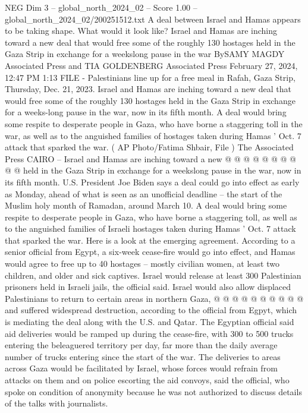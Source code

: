 \begin{textsample}{NEG Dim 3 – global\_north\_2024\_02 – Score 1.00 – global\_north\_2024\_02/200251512.txt}  \label{ex:f3_neg_205}
A deal between Israel and Hamas appears to be taking shape.
What would it look like?
Israel and Hamas are inching toward a new deal that would free some of the roughly 130 hostages held in the Gaza Strip in exchange for a weekslong pause in the war BySAMY MAGDY Associated Press and TIA GOLDENBERG Associated Press February 27, 2024, 12:47 PM 1:13 FILE - Palestinians line up for a free meal in Rafah, Gaza Strip, Thursday, Dec. 21, 2023.
Israel and Hamas are inching toward a new deal that would free some of the roughly 130 hostages held in the Gaza Strip in exchange for a weeks-long pause in the war, now in its fifth month.
A deal would bring some respite to desperate people in Gaza, who have borne a staggering toll in the war, as well as to the anguished families of hostages taken during Hamas ' Oct. 7 attack that sparked the war. ( AP Photo/Fatima Shbair, File ) The Associated Press CAIRO -- Israel and Hamas are inching toward a new @ @ @ @ @ @ @ @ @ @ held in the Gaza Strip in exchange for a weekslong pause in the war, now in its fifth month.
U.S.
President Joe Biden says a deal could go into effect as early as Monday, ahead of what is seen as an unofficial deadline -- the start of the Muslim holy month of Ramadan, around March 10.
A deal would bring some respite to desperate people in Gaza, who have borne a staggering toll, as well as to the anguished families of Israeli hostages taken during Hamas ' Oct. 7 attack that sparked the war.
Here is a look at the emerging agreement.
According to a senior official from Egypt, a six-week cease-fire would go into effect, and Hamas would agree to free up to 40 hostages -- mostly civilian women, at least two children, and older and sick captives.
Israel would release at least 300 Palestinian prisoners held in Israeli jails, the official said.
Israel would also allow displaced Palestinians to return to certain areas in northern Gaza, @ @ @ @ @ @ @ @ @ @ and suffered widespread destruction, according to the official from Egpyt, which is mediating the deal along with the U.S. and Qatar.
The Egyptian official said aid deliveries would be ramped up during the cease-fire, with 300 to 500 trucks entering the beleaguered territory per day, far more than the daily average number of trucks entering since the start of the war.
The deliveries to areas across Gaza would be facilitated by Israel, whose forces would refrain from attacks on them and on police escorting the aid convoys, said the official, who spoke on condition of anonymity because he was not authorized to discuss details of the talks with journalists.

\end{textsample}
